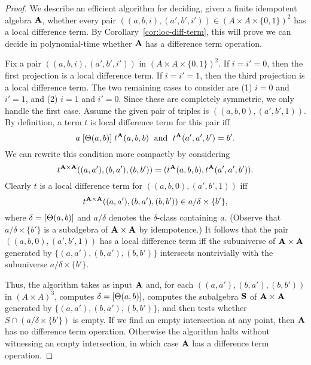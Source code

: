 \begin{proof}
  We describe an efficient algorithm for deciding,
  given a finite idempotent algebra $\mathbf{A}$,
  whether every pair $((a,b,i), (a',b',i')) \in (A\times A \times \{0,1\})^2$ has a local
  difference term.  By Corollary~\ref{cor:loc-diff-term}, this will prove we
  can decide in polynomial-time whether $\mathbf{A}$ has a difference term operation.

  Fix a pair
  $((a,b,i), (a',b',i'))$ in $(A\times A \times \{0,1\})^2$. If $i = i' = 0$,
  then the first projection is a local difference term. If $i = i' = 1$,  
    then the third projection is a local difference term. The two remaining cases to
    consider are (1) $i = 0$ and $i'=1$, and (2)
    $i = 1$ and $i'=0$. Since these are completely symmetric, we only handle the
    first case. Assume  the given pair of triples is
    $((a,b,0), (a',b',1))$.  By definition, a term $t$ is local difference term
    for this pair iff
    \[
    a\mathrel{[\Theta(a,b)]} t^{\mathbf{A}}(a,b,b) \; \text{ and } \;
    t^{\mathbf{A}}(a',a',b') = b'.
    \]
    We can rewrite this condition more compactly by
    considering 
    \[t^{\mathbf{A}\times \mathbf{A}}((a,a'), (b,a'), (b,b')) =
    (t^{\mathbf{A}}(a,b,b),t^{\mathbf{A}}(a',a',b')).\]
    Clearly $t$ is a local difference term for
    $((a,b,0), (a',b',1))$ iff
    \[
    t^{\mathbf{A}\times \mathbf{A}}((a,a'), (b,a'), (b,b'))\in a/\delta \times \{b'\},
    \]
    where $\delta = [\Theta(a,b)]$ and $a/\delta$ denotes the
    $\delta$-class containing $a$.
    (Observe that $a/\delta \times \{b'\}$ is a subalgebra of $\mathbf{A} \times \mathbf{A}$
    by idempotence.)
    It follows that the pair
    $((a,b,0), (a',b',1))$ has a local difference term iff
    the subuniverse of $\mathbf{A}\times \mathbf{A}$ generated by
    $\{(a,a'), (b,a'), (b,b')\}$ intersects nontrivially with the subuniverse
    $a/\delta \times \{b'\}$.

    Thus, the algorithm takes as input $\mathbf{A}$ and, for each 
    $((a,a'), (b,a'), (b,b'))$ in $(A\times A)^3$, computes
    $\delta = [\Theta(a,b)]$, computes the subalgebra
    $\mathbf{S}$ of $\mathbf{A}\times \mathbf{A}$ generated by
    $\{(a,a'), (b,a'), (b,b')\}$, and then
    tests whether $S \cap (a/\delta \times \{b'\})$ is empty.
    If we find an empty intersection at any point, then
    $\mathbf{A}$ has no difference term operation.
    Otherwise the algorithm halts without witnessing an empty
    intersection, in which case $\mathbf{A}$ has a difference term operation.


\end{proof}
